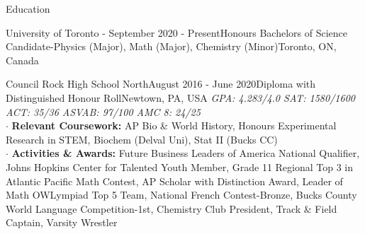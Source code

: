 \documentclass[UTF8]{resume} %
\begin{document}
\begin{rSection}{Education}

\begin{rSubsection}{University of Toronto - }{September 2020 - Present}{Honours Bachelors of Science Candidate-Physics (Major), Math (Major), Chemistry (Minor)}{Toronto, ON, Canada}
    \end{rSubsection}
\begin{rSubsection}{Council Rock High School North}{August 2016 - June 2020}{Diploma with Distinguished Honour Roll}{Newtown, PA, USA}
  \textit{GPA: 4.283/4.0  SAT: 1580/1600  ACT: 35/36  ASVAB: 97/100  AMC 8: 24/25}\\
    \scriptsize{
    $\cdot$ \textbf{Relevant Coursework:} AP Bio \& World History, Honours Experimental Research in STEM, Biochem (Delval Uni), Stat II (Bucks CC)\\
    $\cdot$ \textbf{Activities \& Awards:} Future Business Leaders of America National Qualifier, Johns Hopkins Center for Talented Youth Member, Grade 11 Regional Top 3 in Atlantic Pacific Math Contest, AP Scholar with Distinction Award, Leader of Math OWLympiad Top 5 Team, National French Contest-Bronze, Bucks County World Language Competition-1st, Chemistry Club President, Track \& Field Captain, Varsity Wrestler}
    \end{rSubsection}
\end{rSection}
\end{document}

